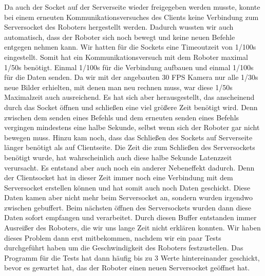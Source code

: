 Da auch der Socket auf der Serverseite wieder freigegeben werden musste, konnte bei einem erneuten Kommunikationsversuches des Clients keine Verbindung zum Serversocket des Roboters hergestellt werden. Dadurch wussten wir auch automatisch, dass der Roboter sich noch bewegt und keine neuen Befehle entgegen nehmen kann. Wir hatten für die Sockets eine Timeoutzeit von 1/100s eingestellt. Somit hat ein Kommunikationsversuch mit dem Roboter maximal 1/50s benötigt. Einmal  1/100s für die Verbindung aufbauen und einmal 1/100s für die Daten senden. Da wir mit der angebauten 30 FPS Kamera nur alle 1/30s neue Bilder erhielten, mit denen man neu rechnen muss, war diese 1/50s Maximalzeit auch ausreichend. Es hat sich aber herausgestellt, das anscheinend durch das Socket öffnen und schließen eine viel größere Zeit benötigt wird. Denn zwischen dem senden eines Befehls und dem erneuten senden eines Befehls vergingen mindestens eine halbe Sekunde, selbst wenn sich der Roboter gar nicht bewegen muss. Hinzu kam noch, dass das Schließen des Sockets auf Serverseite länger benötigt als auf Clientseite. Die Zeit die zum Schließen des Serversockets benötigt wurde, hat wahrscheinlich auch diese halbe Sekunde Latenzzeit verursacht. Es entstand aber auch noch ein anderer Nebeneffekt dadurch. Denn der Clientsocket hat in dieser Zeit immer noch eine Verbindung mit dem Serversocket erstellen können und hat somit auch noch Daten geschickt. Diese Daten kamen aber nicht mehr beim Serversocket an, sondern wurden irgendwo zwischen gebuffert. Beim nächsten öffnen des Serversockets wurden dann diese Daten sofort empfangen und verarbeitet. Durch diesen Buffer entstanden immer Ausreißer des Roboters, die wir uns lange Zeit nicht erklären konnten. Wir haben dieses Problem dann erst mitbekommen, nachdem wir ein paar Tests durchgeführt haben um die Geschwindigkeit des Roboters festzustellen. Das Programm für die Tests hat dann häufig bis zu 3 Werte hintereinander geschickt, bevor es gewartet hat, das der Roboter einen neuen Serversocket geöffnet hat. 

